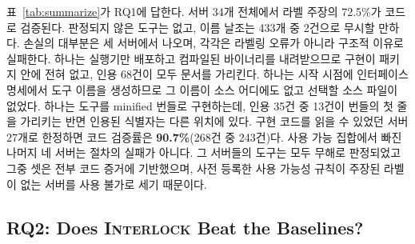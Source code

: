 \documentclass[acmsmall,screen,review,anonymous]{acmart}
\begin{document}
표~\ref{tab:summarize}가 RQ1에 답한다. 서버 34개 전체에서 라벨 주장의 72.5\%가 코드로 검증된다. 판정되지 않은 도구는 없고, 이름 날조는 433개 중 2건으로 무시할 만하다. 손실의 대부분은 세 서버에서 나오며, 각각은 라벨링 오류가 아니라 구조적 이유로 실패한다. 하나는 실행기만 배포하고 컴파일된 바이너리를 내려받으므로 구현이 패키지 안에 전혀 없고, 인용 68건이 모두 문서를 가리킨다. 하나는 시작 시점에 인터페이스 명세에서 도구 이름을 생성하므로 그 이름이 소스 어디에도 없고 선택할 소스 파일이 없었다. 하나는 도구를 minified 번들로 구현하는데, 인용 35건 중 13건이 번들의 첫 줄을 가리키는 반면 인용된 식별자는 다른 위치에 있다. 구현 코드를 읽을 수 있었던 서버 27개로 한정하면 코드 검증률은 \textbf{90.7\%}(268건 중 243건)다. 사용 가능 집합에서 빠진 나머지 네 서버는 절차의 실패가 아니다. 그 서버들의 도구는 모두 무해로 판정되었고 그중 셋은 전부 코드 증거에 기반했으며, 사전 등록한 사용 가능성 규칙이 주장된 라벨이 없는 서버를 사용 불가로 세기 때문이다.

\subsection{RQ2: Does \textsc{Interlock} Beat the Baselines?}
\label{sec:rq2}
\end{document}

